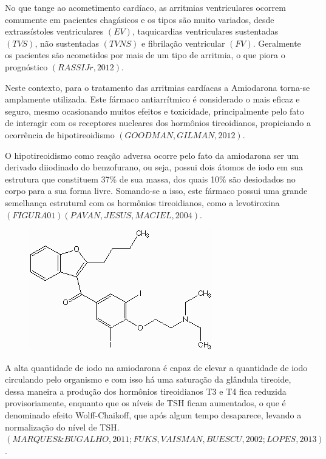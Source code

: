 \documentclass[svgnames,12pt,oneside, openright,a4paper]{scrbook}
\begin{document}
No que tange ao acometimento cardíaco, as arritmias ventriculares ocorrem comumente em pacientes chagásicos e os tipos são muito variados, desde extrassístoles ventriculares $(EV)$, taquicardias ventriculares sustentadas $(TVS)$, não sustentadas $(TVNS)$ e fibrilação ventricular $(FV)$. Geralmente os pacientes são acometidos por mais de um tipo de arritmia, o que piora o prognóstico $(RASSI Jr, 2012)$.

Neste contexto, para o tratamento das arritmias cardíacas a Amiodarona torna-se amplamente utilizada. Este fármaco antiarrítmico é considerado o mais eficaz e seguro, mesmo ocasionando muitos efeitos e toxicidade, principalmente pelo fato de interagir com os receptores nucleares dos hormônios tireoidianos, propiciando a ocorrência de hipotireoidismo $(GOODMAN, GILMAN, 2012)$. 

O hipotireoidismo como reação adversa ocorre pelo fato da amiodarona ser um derivado diiodinado do benzofurano, ou seja, possui dois átomos de iodo em sua estrutura que constituem 37$\%$ de sua massa, dos quais 10$\%$ são desiodados no corpo para a sua forma livre. Somando-se a isso, este fármaco possui uma grande semelhança estrutural com os hormônios tireoidianos, como a levotiroxina$(FIGURA 01) (PAVAN, JESUS, MACIEL, 2004)$.

\begin{figure}
\begin{center}

\includegraphics[scale=1]{molecula.jpg}

\end{center}
\end{figure}

A alta quantidade de iodo na amiodarona é capaz de elevar a quantidade de iodo circulando pelo organismo e com isso há uma saturação da glândula tireoide, dessa maneira a produção dos hormônios tireoidianos T3 e T4 fica reduzida provisoriamente, enquanto que os níveis de TSH ficam aumentados, o que é denominado efeito Wolff-Chaikoff, que após algum tempo desaparece, levando a normalização do nível de TSH.$(MARQUES \& BUGALHO, 2011; FUKS, VAISMAN, BUESCU, 2002; LOPES, 2013)$. 
\end{document}
